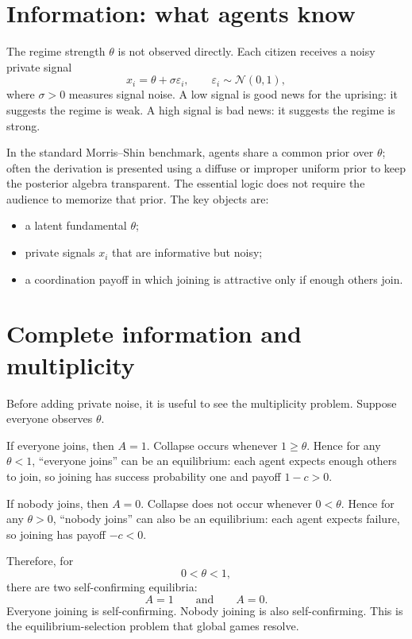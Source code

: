 \documentclass[11pt]{article}
\begin{document}
\section{Information: what agents know}

The regime strength $\theta$ is not observed directly. Each citizen receives a noisy private signal
\[
  x_i=\theta+\sigma\varepsilon_i,
  \qquad
  \varepsilon_i\sim\mathcal{N}(0,1),
\]
where $\sigma>0$ measures signal noise. A low signal is good news for the uprising: it suggests the regime is weak. A high signal is bad news: it suggests the regime is strong.

In the standard Morris--Shin benchmark, agents share a common prior over $\theta$; often the derivation is presented using a diffuse or improper uniform prior to keep the posterior algebra transparent. The essential logic does not require the audience to memorize that prior. The key objects are:
\begin{itemize}
  \item a latent fundamental $\theta$;
  \item private signals $x_i$ that are informative but noisy;
  \item a coordination payoff in which joining is attractive only if enough others join.
\end{itemize}

\section{Complete information and multiplicity}

Before adding private noise, it is useful to see the multiplicity problem. Suppose everyone observes $\theta$.

If everyone joins, then $A=1$. Collapse occurs whenever $1\ge \theta$. Hence for any $\theta<1$, ``everyone joins'' can be an equilibrium: each agent expects enough others to join, so joining has success probability one and payoff $1-c>0$.

If nobody joins, then $A=0$. Collapse does not occur whenever $0<\theta$. Hence for any $\theta>0$, ``nobody joins'' can also be an equilibrium: each agent expects failure, so joining has payoff $-c<0$.

Therefore, for
\[
  0<\theta<1,
\]
there are two self-confirming equilibria:
\[
  A=1
  \qquad\text{and}\qquad
  A=0.
\]
Everyone joining is self-confirming. Nobody joining is also self-confirming. This is the equilibrium-selection problem that global games resolve.
\end{document}
